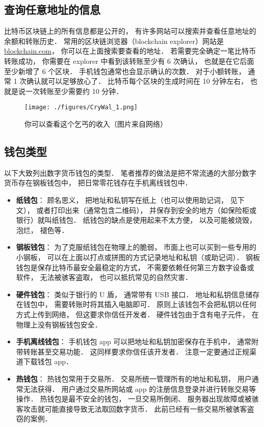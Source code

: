 \subsection{查询任意地址的信息}
比特币区块链上的所有信息都是公开的， 有许多网站可以搜索并查看任意地址的余额和转账历史． 常用的区块链浏览器（blockchain explorer）网站是 \href{https://blockchain.com}{blockchain.com}， 你可以在上面搜索要查看的地址． 若需要完全确定一笔比特币转账成功， 你需要在 explorer 中看到该转账至少有 6 次确认， 也就是在它后面至少新增了 6 个区块． 手机钱包通常也会显示确认的次数． 对于小额转账， 通常 1 次确认就可以足够放心了． 比特币每个区块的生成时间在 10 分钟左右， 也就是说一次转账至少需要约 10 分钟．
\begin{figure}[ht]
\centering
\texttt{[image: ./figures/CryWal\_1.png]}
\caption{你可以查看这个乞丐的收入（图片来自网络）} \label{CryWal_fig1}
\end{figure}

\subsection{钱包类型}
以下大致列出数字货币钱包的类型． 笔者推荐的做法是把不常流通的大部分数字货币存在钢板钱包中， 把日常零花钱存在手机离线钱包中．
\begin{itemize}
\item \textbf{纸钱包}： 顾名思义， 把地址和私钥写在纸上（也可以使用助记词， 见下文）， 或者打印出来（通常包含二维码）， 并保存到安全的地方（如保险柜或银行）就叫纸钱包． 纸钱包的缺点是使用起来不太方便， 以及可能被烧毁， 泡烂， 褪色等．
\item \textbf{钢板钱包}： 为了克服纸钱包在物理上的脆弱， 市面上也可以买到一些专用的小钢板， 可以在上面以打点或拼图的方式记录地址和私钥（或助记词）． 钢板钱包是保存比特币最安全最稳定的方式， 不需要依赖任何第三方数字设备或软件， 无法被骇客盗取， 也可以抵抗常见的自然灾害．
\item \textbf{硬件钱包}： 类似于银行的 U 盾， 通常带有 USB 接口． 地址和私钥信息储存在钱包中， 需要转账时将其插入电脑即可． 原则上该钱包不会把私钥以任何方式上传到网络， 但这要求你信任开发者． 硬件钱包由于含有电子元件， 在物理上没有钢板钱包安全．
\item \textbf{手机离线钱包}： 手机钱包 app 可以把地址和私钥加密保存在手机中， 通常附带转账甚至交易功能． 这同样要求你信任该开发者． 注意一定要通过正规渠道下载钱包 app．
\item \textbf{热钱包}： 热钱包常用于交易所． 交易所统一管理所有的地址和私钥， 用户通常无法获得． 用户通过交易所网站或 app 的注册信息登录并进行转账交易等操作． 热钱包是最不安全的钱包， 一旦交易所倒闭、 服务器出现故障或被骇客攻击就可能直接导致无法取回数字货币． 此前已经有一些交易所被骇客盗窃的案例．
\end{itemize}


